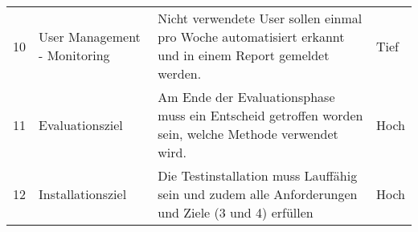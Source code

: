 \begin{landscape}
\begin{table}[H]
{\begin{tabular}{@{}llll@{}}
10           & User Management - Monitoring                      & Nicht verwendete User sollen einmal pro Woche automatisiert erkannt und in einem Report gemeldet werden.                                                                                                                                                                                                                                                                                                                                                                                                                                                                                                                                                                                                                                                                                                                                                                             & Tief               \\
11           & Evaluationsziel                                   & Am Ende der Evaluationsphase muss ein Entscheid getroffen worden sein, welche Methode verwendet wird.                                                                                                                                                                                                                                                                                                                                                                                                                                                                                                                                                                                                                                                                                                                                                                                & Hoch               \\
12           & Installationsziel                                 & Die Testinstallation muss Lauffähig sein und zudem alle Anforderungen und Ziele (3 und 4) erfüllen                                                                                                                                                                                                                                                                                                                                                                                                                                                                                                                                                                                                                                                                                                                                                                                   & Hoch               \\

\end{tabular}}
\end{table}
\end{landscape}
